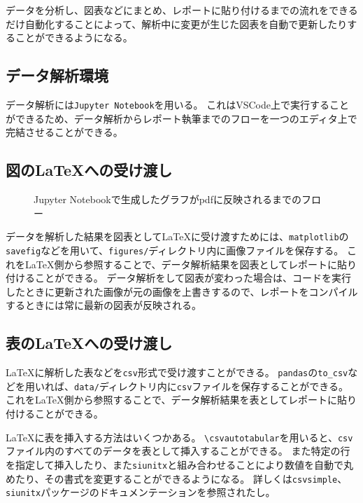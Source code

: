 データを分析し、図表などにまとめ、レポートに貼り付けるまでの流れをできるだけ自動化することによって、解析中に変更が生じた図表を自動で更新したりすることができるようになる。

\subsection{データ解析環境}

データ解析には\verb|Jupyter Notebook|を用いる。
これはVSCode上で実行することができるため、データ解析からレポート執筆までのフローを一つのエディタ上で完結させることができる。


\subsection{図の\LaTeX への受け渡し}

\begin{figure}[htbp]
    \centering
    
    \caption{Jupyter Notebookで生成したグラフがpdfに反映されるまでのフロー}
    \label{fig:flow}
\end{figure}

データを解析した結果を図表として\LaTeX に受け渡すためには、\verb|matplotlib|の\verb|savefig|などを用いて、\verb|figures/|ディレクトリ内に画像ファイルを保存する。
これを\LaTeX 側から参照することで、データ解析結果を図表としてレポートに貼り付けることができる。
データ解析をして図表が変わった場合は、コードを実行したときに更新された画像が元の画像を上書きするので、レポートをコンパイルするときには常に最新の図表が反映される。

\subsection{表の\LaTeX への受け渡し}

\LaTeX に解析した表などを\verb|csv|形式で受け渡すことができる。
\verb|pandas|の\verb|to_csv|などを用いれば、\verb|data/|ディレクトリ内に\verb|csv|ファイルを保存することができる。
これを\LaTeX 側から参照することで、データ解析結果を表としてレポートに貼り付けることができる。

\LaTeX に表を挿入する方法はいくつかある。
\verb|\csvautotabular|を用いると、\verb|csv|ファイル内のすべてのデータを表として挿入することができる。
また特定の行を指定して挿入したり、また\verb|siunitx|と組み合わせることにより数値を自動で丸めたり、その書式を変更することができるようになる。
詳しくは\verb|csvsimple|、\verb|siunitx|パッケージのドキュメンテーションを参照されたし。

